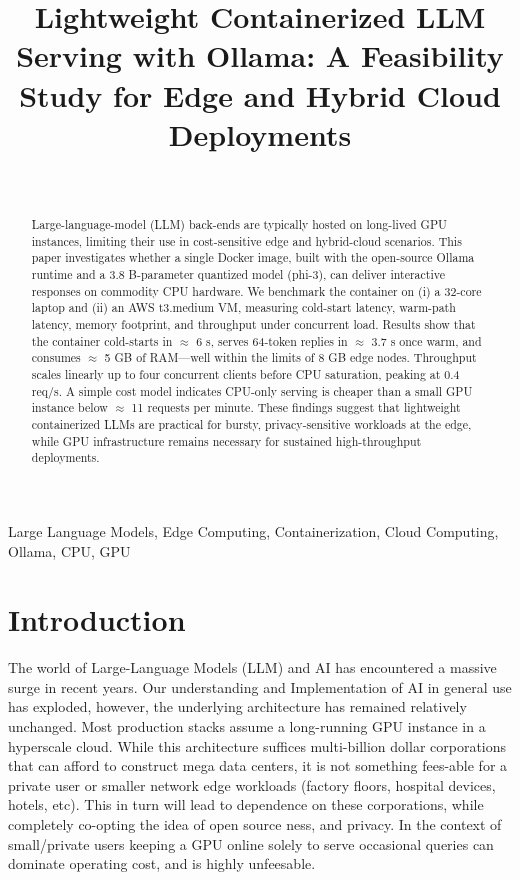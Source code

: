 \documentclass[conference]{IEEEtran}
\title{Lightweight Containerized LLM Serving with Ollama: A Feasibility Study for Edge and Hybrid Cloud Deployments}
\author{%
  \IEEEauthorblockN{Kacper Krakowiak}\\%
  \IEEEauthorblockA{South East Technological University\\%
                    Student ID: C00271692\\%
                    \texttt{C00271692@setu.ie}\\%
                    \texttt{kacper.krakowiak2002@gmail.com}}%
}
\begin{document}
\maketitle

\begin{abstract}

Large-language-model (LLM) back-ends are typically hosted on long-lived GPU instances, limiting their use in cost-sensitive edge and hybrid-cloud scenarios. This paper investigates whether a single Docker image, built with the open-source Ollama runtime and a 3.8 B-parameter quantized model (phi-3), can deliver interactive responses on commodity CPU hardware. We benchmark the container on (i) a 32-core laptop and (ii) an AWS t3.medium VM, measuring cold-start latency, warm-path latency, memory footprint, and throughput under concurrent load. Results show that the container cold-starts in \(\approx\) 6 s, serves 64-token replies in \(\approx\) 3.7 s once warm, and consumes \(\approx\) 5 GB of RAM—well within the limits of 8 GB edge nodes. Throughput scales linearly up to four concurrent clients before CPU saturation, peaking at 0.4 req/s. A simple cost model indicates CPU-only serving is cheaper than a small GPU instance below \(\approx\) 11 requests per minute. These findings suggest that lightweight containerized LLMs are practical for bursty, privacy-sensitive workloads at the edge, while GPU infrastructure remains necessary for sustained high-throughput deployments.
\end{abstract}

\begin{IEEEkeywords}
Large Language Models, Edge Computing, Containerization, Cloud Computing, Ollama, CPU, GPU
\end{IEEEkeywords}

\section{Introduction}\label{sec:intro}

The world of Large-Language Models (LLM) and AI has encountered a massive surge in recent years. Our understanding and Implementation of AI in general use has exploded, however, the underlying architecture has remained relatively unchanged. Most production stacks assume a long-running GPU instance in a hyperscale cloud. While this architecture suffices multi-billion dollar corporations that can afford to construct mega data centers, it is not something fees-able for a private user or smaller network edge workloads (factory floors, hospital devices, hotels, etc). This in turn will lead to dependence on these corporations, while completely co-opting the idea of open source ness, and privacy. In the context of small/private users keeping a GPU online solely to serve occasional queries can dominate operating cost, and is highly unfeesable.
\end{document}
